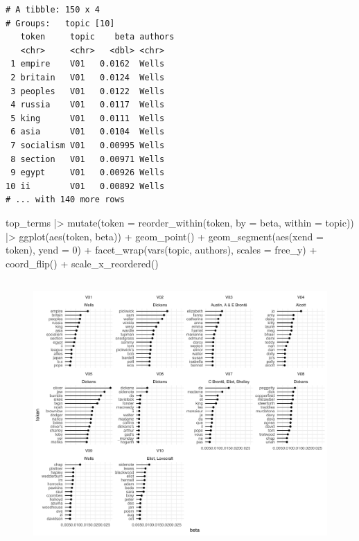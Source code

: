 \documentclass[
]{article}
\newenvironment{Shaded}{\begin{snugshade}}{\end{snugshade}}
\newcommand{\AttributeTok}[1]{\textcolor[rgb]{0.40,0.45,0.13}{#1}}
\newcommand{\DecValTok}[1]{\textcolor[rgb]{0.68,0.00,0.00}{#1}}
\newcommand{\FunctionTok}[1]{\textcolor[rgb]{0.28,0.35,0.67}{#1}}
\newcommand{\NormalTok}[1]{\textcolor[rgb]{0.00,0.23,0.31}{#1}}
\newcommand{\SpecialCharTok}[1]{\textcolor[rgb]{0.37,0.37,0.37}{#1}}
\newcommand{\StringTok}[1]{\textcolor[rgb]{0.13,0.47,0.30}{#1}}
\begin{document}
\begin{verbatim}
# A tibble: 150 x 4
# Groups:   topic [10]
   token     topic    beta authors
   <chr>     <chr>   <dbl> <chr>  
 1 empire    V01   0.0162  Wells  
 2 britain   V01   0.0124  Wells  
 3 peoples   V01   0.0122  Wells  
 4 russia    V01   0.0117  Wells  
 5 king      V01   0.0111  Wells  
 6 asia      V01   0.0104  Wells  
 7 socialism V01   0.00995 Wells  
 8 section   V01   0.00971 Wells  
 9 egypt     V01   0.00926 Wells  
10 ii        V01   0.00892 Wells  
# ... with 140 more rows
\end{verbatim}

\begin{Shaded}
\begin{Highlighting}[]
\NormalTok{top\_terms }\SpecialCharTok{|\textgreater{}} 
    \FunctionTok{mutate}\NormalTok{(}\AttributeTok{token =} \FunctionTok{reorder\_within}\NormalTok{(token, }
                                  \AttributeTok{by =}\NormalTok{ beta, }
                                  \AttributeTok{within =}\NormalTok{ topic)) }\SpecialCharTok{|\textgreater{}} 
    \FunctionTok{ggplot}\NormalTok{(}\FunctionTok{aes}\NormalTok{(token, beta)) }\SpecialCharTok{+}
    \FunctionTok{geom\_point}\NormalTok{() }\SpecialCharTok{+}
    \FunctionTok{geom\_segment}\NormalTok{(}\FunctionTok{aes}\NormalTok{(}\AttributeTok{xend =}\NormalTok{ token), }\AttributeTok{yend =} \DecValTok{0}\NormalTok{) }\SpecialCharTok{+}
    \FunctionTok{facet\_wrap}\NormalTok{(}\FunctionTok{vars}\NormalTok{(topic, authors), }\AttributeTok{scales =} \StringTok{\textquotesingle{}free\_y\textquotesingle{}}\NormalTok{) }\SpecialCharTok{+}
    \FunctionTok{coord\_flip}\NormalTok{() }\SpecialCharTok{+}
    \FunctionTok{scale\_x\_reordered}\NormalTok{()}
\end{Highlighting}
\end{Shaded}

\begin{figure}[H]

{\centering \includegraphics[width=6in,height=4in]{paper_files/figure-pdf/unnamed-chunk-53-1.pdf}

}

\end{figure}
\end{document}
